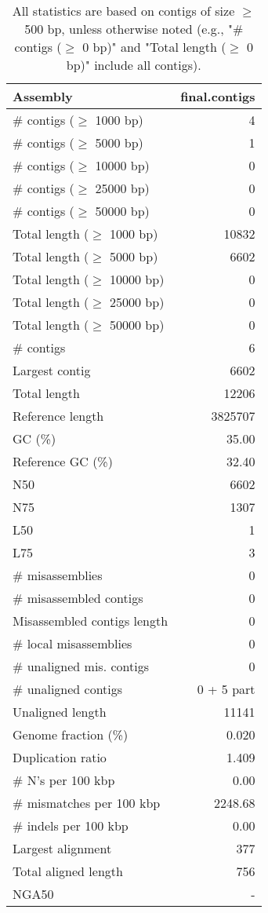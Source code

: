 \documentclass[12pt,a4paper]{article}
\begin{document}
\begin{table}[ht]
\begin{center}
\caption{All statistics are based on contigs of size $\geq$ 500 bp, unless otherwise noted (e.g., "\# contigs ($\geq$ 0 bp)" and "Total length ($\geq$ 0 bp)" include all contigs).}
\begin{tabular}{|l*{1}{|r}|}
\hline
Assembly & final.contigs \\ \hline
\# contigs ($\geq$ 1000 bp) & 4 \\ \hline
\# contigs ($\geq$ 5000 bp) & 1 \\ \hline
\# contigs ($\geq$ 10000 bp) & 0 \\ \hline
\# contigs ($\geq$ 25000 bp) & 0 \\ \hline
\# contigs ($\geq$ 50000 bp) & 0 \\ \hline
Total length ($\geq$ 1000 bp) & 10832 \\ \hline
Total length ($\geq$ 5000 bp) & 6602 \\ \hline
Total length ($\geq$ 10000 bp) & 0 \\ \hline
Total length ($\geq$ 25000 bp) & 0 \\ \hline
Total length ($\geq$ 50000 bp) & 0 \\ \hline
\# contigs & 6 \\ \hline
Largest contig & 6602 \\ \hline
Total length & 12206 \\ \hline
Reference length & 3825707 \\ \hline
GC (\%) & 35.00 \\ \hline
Reference GC (\%) & 32.40 \\ \hline
N50 & 6602 \\ \hline
N75 & 1307 \\ \hline
L50 & 1 \\ \hline
L75 & 3 \\ \hline
\# misassemblies & 0 \\ \hline
\# misassembled contigs & 0 \\ \hline
Misassembled contigs length & 0 \\ \hline
\# local misassemblies & 0 \\ \hline
\# unaligned mis. contigs & 0 \\ \hline
\# unaligned contigs & 0 + 5 part \\ \hline
Unaligned length & 11141 \\ \hline
Genome fraction (\%) & 0.020 \\ \hline
Duplication ratio & 1.409 \\ \hline
\# N's per 100 kbp & 0.00 \\ \hline
\# mismatches per 100 kbp & 2248.68 \\ \hline
\# indels per 100 kbp & 0.00 \\ \hline
Largest alignment & 377 \\ \hline
Total aligned length & 756 \\ \hline
NGA50 & - \\ \hline
\end{tabular}
\end{center}
\end{table}
\end{document}

